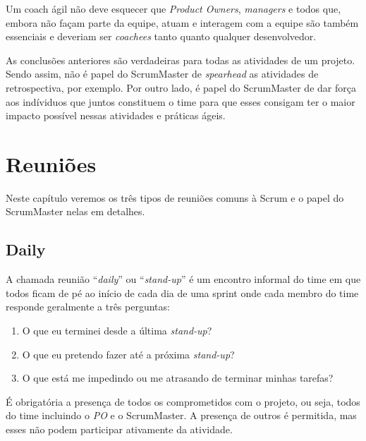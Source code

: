 \documentclass{iiufrgs}
\begin{document}
Um coach ágil não deve esquecer que \textit{Product Owners}, \textit{managers} e todos que, embora não façam parte da equipe, atuam e interagem com a equipe são também essenciais e deveriam ser \textit{coachees} tanto quanto qualquer desenvolvedor.

As conclusões anteriores são verdadeiras para todas as atividades de um projeto. Sendo assim, não é papel do ScrumMaster de \textit{spearhead} as atividades de retrospectiva, por exemplo. Por outro lado, é papel do ScrumMaster de dar força aos indíviduos que juntos constituem o time para que esses consigam ter o maior impacto possível nessas atividades e práticas ágeis. 

%

\chapter{Reuniões}\label{reunioes}

Neste capítulo veremos os três tipos de reuniões comuns à Scrum e o papel do ScrumMaster nelas em detalhes. 


\section{Daily}\label{daily}

A chamada reunião \enquote{\textit{daily}} ou \enquote{\textit{stand-up}} é um encontro informal do time em que todos ficam de pé ao início de cada dia de uma sprint onde cada membro do time responde geralmente a três perguntas:

\begin{enumerate}[leftmargin=3em, noitemsep, nosep, before=\vspace{1cm}, after=\vspace{1cm}]
    \setlength{\itemindent}{1em}
    \item O que eu terminei desde a última \textit{stand-up}?
    \item O que eu pretendo fazer até a próxima \textit{stand-up}?
    \item O que está me impedindo ou me atrasando de terminar minhas tarefas?
    \label{perguntas-daily}
\end{enumerate}

É obrigatória a presença de todos os comprometidos com o projeto, ou seja, todos do time incluindo o \textit{PO} e o ScrumMaster. A presença de outros é permitida, mas esses não podem participar ativamente da atividade.
\end{document}
